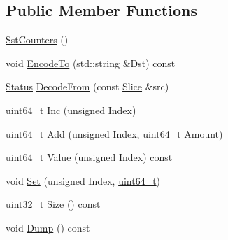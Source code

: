 \subsection*{Public Member Functions}
\begin{DoxyCompactItemize}
\item 
\hyperlink{classleveldb_1_1_sst_counters_a55ec06470930ecd9a5fc73889dff8a9c}{Sst\+Counters} ()
\item 
void \hyperlink{classleveldb_1_1_sst_counters_a6114ad2901eb963af1498057f7d85166}{Encode\+To} (std\+::string \&Dst) const 
\item 
\hyperlink{classleveldb_1_1_status}{Status} \hyperlink{classleveldb_1_1_sst_counters_a2e1ed4f36119a8040dc47b66d52900e3}{Decode\+From} (const \hyperlink{classleveldb_1_1_slice}{Slice} \&src)
\item 
\hyperlink{stdint_8h_aaa5d1cd013383c889537491c3cfd9aad}{uint64\+\_\+t} \hyperlink{classleveldb_1_1_sst_counters_a5c25e14172d7733da280c01b90e21431}{Inc} (unsigned Index)
\item 
\hyperlink{stdint_8h_aaa5d1cd013383c889537491c3cfd9aad}{uint64\+\_\+t} \hyperlink{classleveldb_1_1_sst_counters_a615c96551f0b1f5cb8cc3e0dcbb8568e}{Add} (unsigned Index, \hyperlink{stdint_8h_aaa5d1cd013383c889537491c3cfd9aad}{uint64\+\_\+t} Amount)
\item 
\hyperlink{stdint_8h_aaa5d1cd013383c889537491c3cfd9aad}{uint64\+\_\+t} \hyperlink{classleveldb_1_1_sst_counters_a61f7aaec238086d81f0d121cc4517012}{Value} (unsigned Index) const 
\item 
void \hyperlink{classleveldb_1_1_sst_counters_a3a49aaddb7f816a18175d4a77273785e}{Set} (unsigned Index, \hyperlink{stdint_8h_aaa5d1cd013383c889537491c3cfd9aad}{uint64\+\_\+t})
\item 
\hyperlink{stdint_8h_a435d1572bf3f880d55459d9805097f62}{uint32\+\_\+t} \hyperlink{classleveldb_1_1_sst_counters_a8ecd077f4b491eaf99afc7db31c655c8}{Size} () const 
\item 
void \hyperlink{classleveldb_1_1_sst_counters_ae7f2135760a886b0ae72d4ea90351f16}{Dump} () const 
\end{DoxyCompactItemize}
